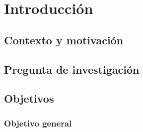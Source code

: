 \chapter{Introducción}

\section{Contexto y motivación}

\section{Pregunta de investigación}
%

\section{Objetivos}

\subsection{Objetivo general}

